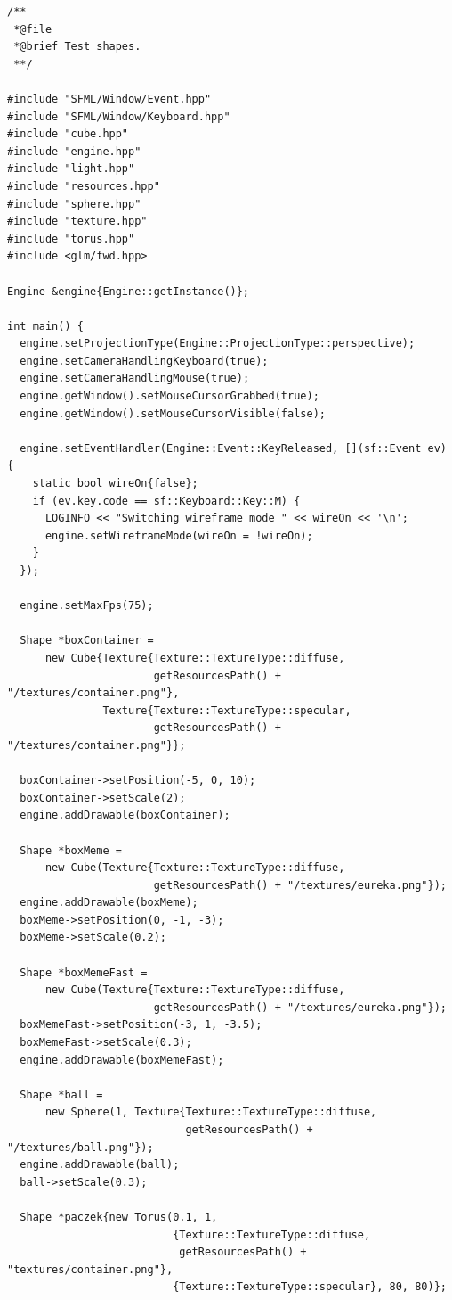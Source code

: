 \documentclass[11pt]{article}
\begin{document}
\begin{verbatim}
/**
 *@file
 *@brief Test shapes.
 **/

#include "SFML/Window/Event.hpp"
#include "SFML/Window/Keyboard.hpp"
#include "cube.hpp"
#include "engine.hpp"
#include "light.hpp"
#include "resources.hpp"
#include "sphere.hpp"
#include "texture.hpp"
#include "torus.hpp"
#include <glm/fwd.hpp>

Engine &engine{Engine::getInstance()};

int main() {
  engine.setProjectionType(Engine::ProjectionType::perspective);
  engine.setCameraHandlingKeyboard(true);
  engine.setCameraHandlingMouse(true);
  engine.getWindow().setMouseCursorGrabbed(true);
  engine.getWindow().setMouseCursorVisible(false);

  engine.setEventHandler(Engine::Event::KeyReleased, [](sf::Event ev) {
    static bool wireOn{false};
    if (ev.key.code == sf::Keyboard::Key::M) {
      LOGINFO << "Switching wireframe mode " << wireOn << '\n';
      engine.setWireframeMode(wireOn = !wireOn);
    }
  });

  engine.setMaxFps(75);

  Shape *boxContainer =
      new Cube{Texture{Texture::TextureType::diffuse,
                       getResourcesPath() + "/textures/container.png"},
               Texture{Texture::TextureType::specular,
                       getResourcesPath() + "/textures/container.png"}};

  boxContainer->setPosition(-5, 0, 10);
  boxContainer->setScale(2);
  engine.addDrawable(boxContainer);

  Shape *boxMeme =
      new Cube(Texture{Texture::TextureType::diffuse,
                       getResourcesPath() + "/textures/eureka.png"});
  engine.addDrawable(boxMeme);
  boxMeme->setPosition(0, -1, -3);
  boxMeme->setScale(0.2);

  Shape *boxMemeFast =
      new Cube(Texture{Texture::TextureType::diffuse,
                       getResourcesPath() + "/textures/eureka.png"});
  boxMemeFast->setPosition(-3, 1, -3.5);
  boxMemeFast->setScale(0.3);
  engine.addDrawable(boxMemeFast);

  Shape *ball =
      new Sphere(1, Texture{Texture::TextureType::diffuse,
                            getResourcesPath() + "/textures/ball.png"});
  engine.addDrawable(ball);
  ball->setScale(0.3);

  Shape *paczek{new Torus(0.1, 1,
                          {Texture::TextureType::diffuse,
                           getResourcesPath() + "textures/container.png"},
                          {Texture::TextureType::specular}, 80, 80)};


\end{verbatim}
\end{document}
